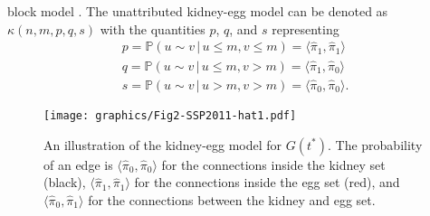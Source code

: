 \documentclass[10pt,draftclsnofoot,onecolumn]{IEEEtran}
\theoremstyle{definition}
\begin{document}
block model \cite{Holland1983}. The unattributed kidney-egg model
can be denoted as $\kappa(n,m,p,q,s)$ with the quantities $p$, $q$,
and $s$ representing
\begin{gather*}
p = \mathbb{P}(u \sim v \, | \, u \leq m, v \leq m) = \langle
\hat{\pi}_1, \hat{\pi}_1 \rangle \\ q =
\mathbb{P}(u \sim v \, | \, u \leq m, v > m) = \langle \hat{\pi}_1,
\hat{\pi}_0 \rangle \\ s = \mathbb{P}(u
\sim v \, | \, u > m, v > m) = \langle \hat{\pi}_0, \hat{\pi}_0
\rangle . 
\end{gather*}
\begin{figure}[!tp]
  \centering
  \texttt{[image: graphics/Fig2-SSP2011-hat1.pdf]}
  \caption{An illustration of the kidney-egg model for $G(t^{*})$. The
    probability of an edge is $\langle \hat{\pi}_0, \hat{\pi}_0
    \rangle$ for the connections inside the kidney set (black), $\langle
    \hat{\pi}_1, \hat{\pi}_1 \rangle$ for the connections inside the egg set
    (red), and $\langle \hat{\pi}_0, \hat{\pi}_1 \rangle$ for the connections
    between the kidney and egg set.}
  \label{fig:kidney-egg}
\end{figure}
\end{document}

